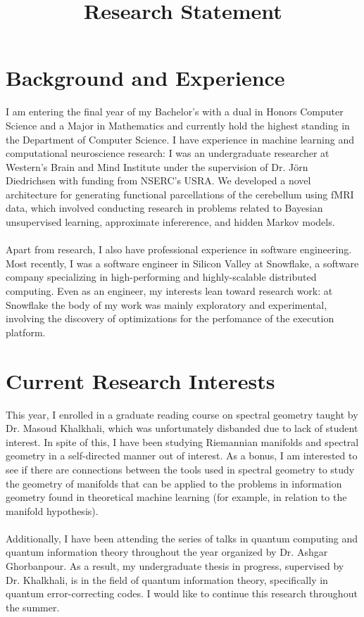 \documentclass[11pt,a4paper,sans]{moderncv} %
\title{Research Statement}
\begin{document}
\makecvtitle %

\section{Background and Experience}
I am entering the final year of my Bachelor's with a dual in Honors Computer Science and a Major in Mathematics and currently hold the highest standing in the Department of Computer Science. I have experience in machine learning and computational neuroscience research: I was an undergraduate researcher at Western's Brain and Mind Institute under the supervision of Dr. Jörn Diedrichsen with funding from NSERC's USRA. We developed a novel architecture for generating functional parcellations of the cerebellum using fMRI data, which involved conducting research in problems related to Bayesian unsupervised learning, approximate infererence, and hidden Markov models.
\\\\
Apart from research, I also have professional experience in software engineering. Most recently, I was a software engineer in Silicon Valley at Snowflake, a software company specializing in high-performing and highly-scalable distributed computing. Even as an engineer, my interests lean toward research work: at Snowflake the body of my work was mainly exploratory and experimental, involving the discovery of optimizations for the perfomance of the execution platform.

\section{Current Research Interests}
This year, I enrolled in a graduate reading course on spectral geometry taught by Dr. Masoud Khalkhali, which was unfortunately disbanded due to lack of student interest. In spite of this, I have been studying Riemannian manifolds and spectral geometry in a self-directed manner out of interest. As a bonus, I am interested to see if there are connections between the tools used in spectral geometry to study the geometry of manifolds that can be applied to the problems in information geometry found in theoretical machine learning (for example, in relation to the manifold hypothesis).
\\\\
Additionally, I have been attending the series of talks in quantum computing and quantum information theory throughout the year organized by Dr. Ashgar Ghorbanpour. As a result, my undergraduate thesis in progress, supervised by Dr. Khalkhali, is in the field of quantum information theory, specifically in quantum error-correcting codes. I would like to continue this research throughout the summer.
\end{document}

